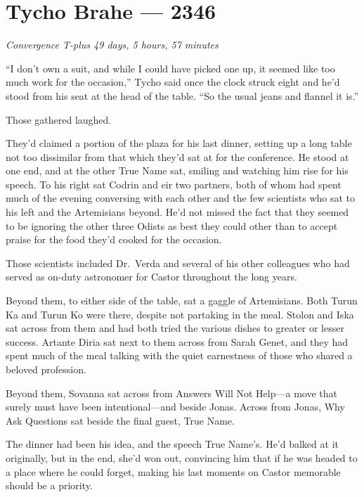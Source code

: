 \hypertarget{tycho-brahe-2346}{%
\chapter{Tycho Brahe — 2346}}

\begin{center}
\emph{Convergence T-plus 49 days, 5 hours, 57 minutes}
\end{center}

\noindent ``I don't own a suit, and while I could have picked one up, it seemed like too much work for the occasion,'' Tycho said once the clock struck eight and he'd stood from his seat at the head of the table. ``So the usual jeans and flannel it is.''

Those gathered laughed.

They'd claimed a portion of the plaza for his last dinner, setting up a long table not too dissimilar from that which they'd sat at for the conference. He stood at one end, and at the other True Name sat, smiling and watching him rise for his speech. To his right sat Codrin and eir two partners, both of whom had spent much of the evening conversing with each other and the few scientists who sat to his left and the Artemisians beyond. He'd not missed the fact that they seemed to be ignoring the other three Odists as best they could other than to accept praise for the food they'd cooked for the occasion.

Those scientists included Dr.~Verda and several of his other colleagues who had served as on-duty astronomer for Castor throughout the long years.

Beyond them, to either side of the table, sat a gaggle of Artemisians. Both Turun Ka and Turun Ko were there, despite not partaking in the meal. Stolon and Iska sat across from them and had both tried the various dishes to greater or lesser success. Artante Diria sat next to them across from Sarah Genet, and they had spent much of the meal talking with the quiet earnestness of those who shared a beloved profession.

Beyond them, Sovanna sat across from Answers Will Not Help—a move that surely must have been intentional—and beside Jonas. Across from Jonas, Why Ask Questions sat beside the final guest, True Name.

The dinner had been his idea, and the speech True Name's. He'd balked at it originally, but in the end, she'd won out, convincing him that if he was headed to a place where he could forget, making his last moments on Castor memorable should be a priority.


